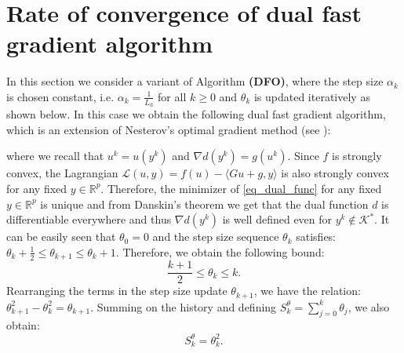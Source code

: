 \documentclass{gOMS2e}
\theoremstyle{plain}
\theoremstyle{definition}
\theoremstyle{remark}
\begin{document}
\section{Rate of convergence of dual  fast gradient algorithm}
\label{sec_dfg} \noindent In this section we consider a variant of
Algorithm {\bf (DFO)}, where the step size  $\alpha_k$ is chosen
constant, i.e. $\alpha_k = \frac{1}{L_\text{d}}$ for all $k \geq 0$
and $\theta_k$ is updated iteratively as shown below. In this case
we obtain the following dual fast gradient algorithm, which is an
extension of Nesterov's optimal gradient method \cite{Nes:04} (see
 \cite{BecTeb:14,Tse:08,Tse:10}):
\begin{center}
\end{center}
where we  recall that $u^k = u(y^k)$   and  ${\nabla} d(y^k)=
g({}{u}^k)$. Since $f$ is strongly convex, the Lagrangian ${\mathcal{L}}(u,y)
= f(u) - \langle Gu + g, y \rangle$ is also strongly convex for any
fixed $y \in {\mathbb{R}}^p$.  Therefore,  the minimizer of \eqref{eq_dual_func} for any fixed $y \in {\mathbb{R}}^p$ is unique and from Danskin's theorem \cite{RocWet:98} we get that the
dual function $d$ is differentiable everywhere  and thus $\nabla d(y^k)$ is well defined even for $y^k \not \in {\mathcal{K}}^*$. It can be easily seen that $\theta_0= 0$ and the
step size sequence $\theta_k$ satisfies: $\theta_k + \frac{1}{2} \le
\theta_{k+1} \le \theta_k + 1$. Therefore, we obtain the following
bound:
\begin{equation}\label{theta_1}
\frac{k+1}{2} \le \theta_k \le k.
\end{equation}
Rearranging the terms in the step size update $\theta_{k+1}$, we
have the relation:  $\theta_{k+1}^2 - \theta_k^2 = \theta_{k+1}$.
Summing on the history and defining  $S_k^\theta =
\sum\limits_{j=0}^k \theta_j$, we also obtain:
\begin{equation}\label{theta_2}
S_k^\theta = \theta_k^2.
\end{equation}
\end{document}

